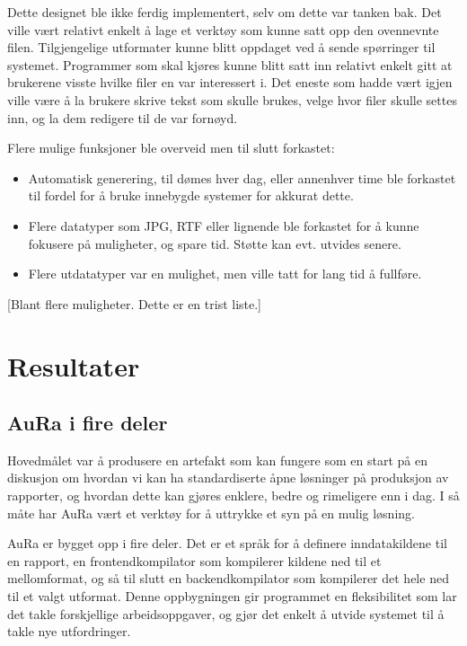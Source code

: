 \documentclass[11pt]{article}
\begin{document}
Dette designet ble ikke ferdig implementert, selv om dette var tanken bak. Det ville vært relativt enkelt å lage et verktøy som kunne satt opp den ovennevnte filen. Tilgjengelige utformater kunne blitt oppdaget ved å sende spørringer til systemet. Programmer som skal kjøres kunne blitt satt inn relativt enkelt gitt at brukerene visste hvilke filer en var interessert i. Det eneste som hadde vært igjen ville være å la brukere skrive tekst som skulle brukes, velge hvor filer skulle settes inn, og la dem redigere til de var fornøyd.



Flere mulige funksjoner ble overveid men til slutt forkastet:




\begin{itemize}
\item Automatisk generering, til dømes hver dag, eller annenhver time ble forkastet til fordel for å bruke innebygde systemer for akkurat dette.
\item Flere datatyper som JPG, RTF eller lignende ble forkastet for å kunne fokusere på muligheter, og spare tid. Støtte kan evt. utvides senere.
\item Flere utdatatyper var en mulighet, men ville tatt for lang tid å fullføre.
\end{itemize}




[Blant flere muligheter. Dette er en trist liste.]

\section{Resultater}



\subsection{AuRa i fire deler}



Hovedmålet var å produsere en artefakt som kan fungere som en start på en diskusjon om hvordan vi kan ha standardiserte åpne løsninger på produksjon av rapporter, og hvordan dette kan gjøres enklere, bedre og rimeligere enn i dag. I så måte har AuRa vært et verktøy for å uttrykke et syn på en mulig løsning.



AuRa er bygget opp i fire deler. Det er et språk for å definere inndatakildene til en rapport, en frontendkompilator som kompilerer kildene ned til et mellomformat, og så til slutt en backendkompilator som kompilerer det hele ned til et valgt utformat.
Denne oppbygningen gir programmet en fleksibilitet som lar det takle forskjellige arbeidsoppgaver, og gjør det enkelt å utvide systemet til å takle nye utfordringer.
\end{document}
